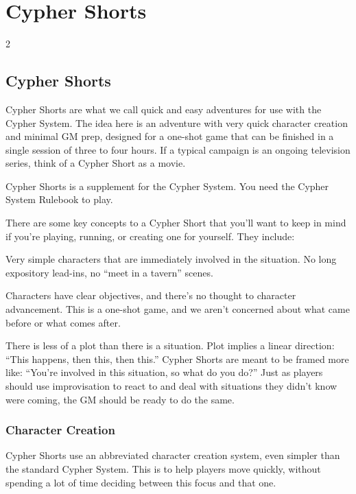 \part{Cypher Shorts}

\begin{multicols}{2}

\chapter{Cypher Shorts}

Cypher Shorts are what we call quick and easy adventures for use with the Cypher System. The idea here is an adventure with very quick character creation and minimal GM prep, designed for a one-shot game that can be finished in a single session of three to four hours. If a typical campaign is an ongoing television series, think of a Cypher Short as a movie.

Cypher Shorts is a supplement for the Cypher System. You need the Cypher System Rulebook to play.

There are some key concepts to a Cypher Short that you’ll want to keep in mind if you’re playing, running, or creating one for yourself. They include:

Very simple characters that are immediately involved in the situation. No long expository lead-ins, no “meet in a tavern” scenes.

Characters have clear objectives, and there’s no thought to character advancement. This is a one-shot game, and we aren’t concerned about what came before or what comes after.

There is less of a plot than there is a situation. Plot implies a linear direction: “This happens, then this, then this.” Cypher Shorts are meant to be framed more like: “You’re involved in this situation, so what do you do?”
Just as players should use improvisation to react to and deal with situations they didn’t know were coming, the GM should be ready to do the same.

\section{Character Creation}

Cypher Shorts use an abbreviated character creation system, even simpler than the standard Cypher System. This is to help players move quickly, without spending a lot of time deciding between this focus and that one.


\end{multicols}
